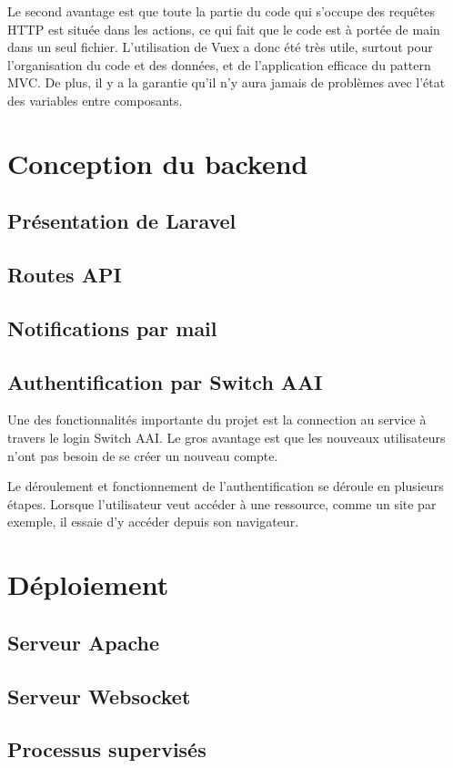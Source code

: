\documentclass[
    iai, %
    eai, %
]{heig-tb}
\begin{document}
Le second avantage est que toute la partie du code qui s'occupe des requêtes HTTP est située dans les actions, ce qui fait que le code est à portée de main dans un seul fichier.
L'utilisation de Vuex a donc été très utile, surtout pour l'organisation du code et des données, et de l'application efficace du pattern MVC.
De plus, il y a la garantie qu'il n'y aura jamais de problèmes avec l'état des variables entre composants.

\chapter{Conception du backend}
\section{Présentation de Laravel}
\section{Routes API}
\section{Notifications par mail}
\section{Authentification par Switch AAI}
Une des fonctionnalités importante du projet est la connection au service à travers le login Switch AAI.
Le gros avantage est que les nouveaux utilisateurs n'ont pas besoin de se créer un nouveau compte.

Le déroulement et fonctionnement de l'authentification se déroule en plusieurs étapes.
Lorsque l'utilisateur veut accéder à une ressource, comme un site par exemple, il essaie d'y accéder depuis son navigateur.



\chapter{Déploiement}
\section{Serveur Apache}
\section{Serveur Websocket}
\section{Processus supervisés}
\end{document}
